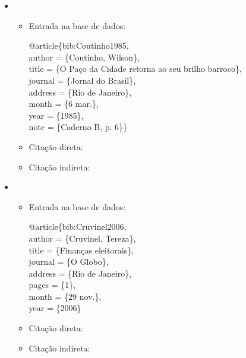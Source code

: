 \documentclass[a4paper,12pt,oneside,onecolumn]{uerj}
\newcommand{\formato}[1]{\begin{flushleft}{#1}\end{flushleft}}
\begin{document}
\begin{itemize}[label={Ex.:},leftmargin=\parindent,parsep=0pt,itemsep=0pt]
  \item \formato{\citetext{bib:Coutinho1985}}

  \begin{itemize}[leftmargin=*,parsep=0pt,itemsep=0pt]
    \item Entrada na base de dados:

    \formato{
      @article\{bib:Coutinho1985,\\
        author = \{Coutinho, Wilson\},\\
        title = \{O {P}a{\c c}o da {C}idade retorna ao seu brilho barroco\},\\
        journal = \{Jornal do Brasil\},\\
        address = \{Rio de Janeiro\},\\
        month = \{6 mar.\},\\
        year = \{1985\},\\
        note = \{Caderno B, p. 6\}\}\\
    }

    \item Citação direta: 
    \item Citação indireta: \cite{bib:Coutinho1985}\\
  \end{itemize}

  \item \formato{\citetext{bib:Cruvinel2006}}

  \begin{itemize}[leftmargin=*,parsep=0pt,itemsep=0pt]
    \item Entrada na base de dados:

    \formato{
      @article\{bib:Cruvinel2006,\\
        author = \{Cruvinel, Tereza\},\\
        title = \{Finan{\c c}as eleitorais\},\\
        journal = \{O Globo\},\\
        address = \{Rio de Janeiro\},\\
        pages = \{1\},\\
        month = \{29 nov.\},\\
        year = \{2006\}\\
    }

    \item Citação direta: 
    \item Citação indireta: \cite{bib:Cruvinel2006}
  \end{itemize}
\end{itemize}
\end{document}
